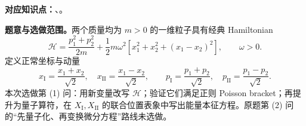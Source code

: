 \textbf{对应知识点：}、。

\textbf{题意与选做范围。}两个质量均为 $m>0$ 的一维粒子具有经典 Hamiltonian
\begin{equation}
  \mathcal H=\frac{p_1^2+p_2^2}{2m}
   +\frac12m\omega^2\left[x_1^2+x_2^2+(x_1-x_2)^2\right],\qquad\omega>0.
\end{equation}
定义正常坐标与动量
\begin{equation}
  x_{\mathrm I}=\frac{x_1+x_2}{\sqrt2},\quad
  x_{\mathrm{II}}=\frac{x_1-x_2}{\sqrt2},\qquad
  p_{\mathrm I}=\frac{p_1+p_2}{\sqrt2},\quad
  p_{\mathrm{II}}=\frac{p_1-p_2}{\sqrt2}.
\end{equation}
本次选做第 (1) 问：用新变量改写 $\mathcal H$；验证它们满足正则 Poisson bracket；再提升为量子算符，在 $X_{\mathrm I},X_{\mathrm{II}}$ 的联合位置表象中写出能量本征方程。原题第 (2) 问的“先量子化、再变换微分方程”路线未选做。

